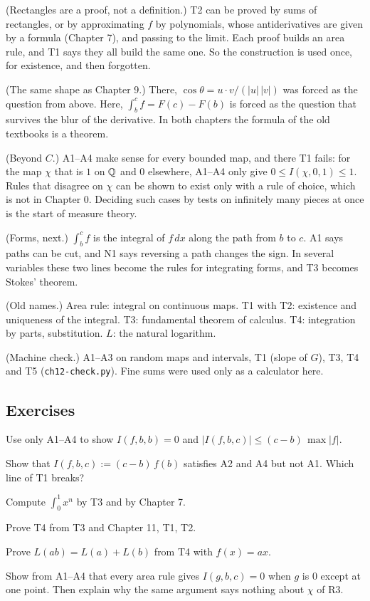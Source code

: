 \begin{lines}
\item[\lab{R1}] (Rectangles are a proof, not a definition.) T2 can be proved by sums of rectangles, or by approximating $f$ by polynomials, whose antiderivatives are given by a formula (Chapter 7), and passing to the limit. Each proof builds an area rule, and T1 says they all build the same one. So the construction is used once, for existence, and then forgotten.
\item[\lab{R2}] (The same shape as Chapter 9.) There, $\cos\theta = u \cdot v / (|u|\,|v|)$ was forced as the question from above. Here, $\int_b^c f = F(c) - F(b)$ is forced as the question that survives the blur of the derivative. In both chapters the formula of the old textbooks is a theorem.
\item[\lab{R3}] (Beyond $C$.) A1--A4 make sense for every bounded map, and there T1 fails: for the map $\chi$ that is $1$ on $\mathbb{Q}$ and $0$ elsewhere, A1--A4 only give $0 \le I(\chi, 0, 1) \le 1$. Rules that disagree on $\chi$ can be shown to exist only with a rule of choice, which is not in Chapter 0. Deciding such cases by tests on infinitely many pieces at once is the start of measure theory.
\item[\lab{R4}] (Forms, next.) $\int_b^c f$ is the integral of $f\,dx$ along the path from $b$ to $c$. A1 says paths can be cut, and N1 says reversing a path changes the sign. In several variables these two lines become the rules for integrating forms, and T3 becomes Stokes' theorem.
\item[\lab{R5}] (Old names.) Area rule: integral on continuous maps. T1 with T2: existence and uniqueness of the integral. T3: fundamental theorem of calculus. T4: integration by parts, substitution. $L$: the natural logarithm.
\item[\lab{R6}] (Machine check.) A1--A3 on random maps and intervals, T1 (slope of $G$), T3, T4 and T5 (\texttt{ch12-check.py}). Fine sums were used only as a calculator here.
\end{lines}

\subsection*{Exercises}

\begin{lines}
\item[\lab{E1}] Use only A1--A4 to show $I(f, b, b) = 0$ and $|I(f, b, c)| \le (c - b)\,\max |f|$.
\item[\lab{E2}] Show that $I(f, b, c) := (c - b)\,f(b)$ satisfies A2 and A4 but not A1. Which line of T1 breaks?
\item[\lab{E3}] Compute $\int_0^1 x^n$ by T3 and by Chapter 7.
\item[\lab{E4}] Prove T4 from T3 and Chapter 11, T1, T2.
\item[\lab{E5}] Prove $L(ab) = L(a) + L(b)$ from T4 with $f(x) = a x$.
\item[\lab{E6}] Show from A1--A4 that every area rule gives $I(g, b, c) = 0$ when $g$ is $0$ except at one point. Then explain why the same argument says nothing about $\chi$ of R3.
\end{lines}

